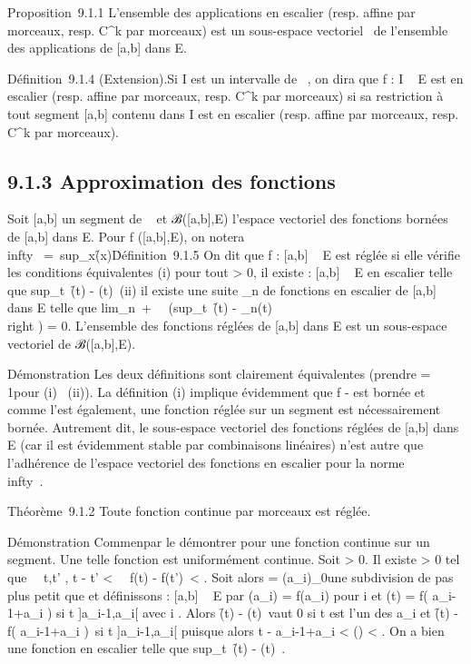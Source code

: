 \documentclass[]{article}
\begin{document}
Proposition~9.1.1 L'ensemble des applications en escalier (resp. affine
par morceaux, resp. C^k par morceaux) est un sous-espace
vectoriel ~de l'ensemble des applications de [a,b] dans E.

Définition~9.1.4 (Extension).Si I est un intervalle de ~, on dira que f
: I \rightarrow~ E est en escalier (resp. affine par morceaux, resp. C^k
par morceaux) si sa restriction à tout segment [a,b] contenu dans I
est en escalier (resp. affine par morceaux, resp. C^k par
morceaux).

\subsection{9.1.3 Approximation des fonctions}

Soit [a,b] un segment de ~ et ℬ([a,b],E) l'espace vectoriel des
fonctions bornées de [a,b] dans E. Pour f ([a,b],E), on notera
\f\\infty~
=\
sup_x\in[a,b]\f(x)\.

Définition~9.1.5 On dit que f : [a,b] \rightarrow~ E est réglée si elle vérifie
les conditions équivalentes (i) pour tout \epsilon > 0, il existe
\phi : [a,b] \rightarrow~ E en escalier telle que
sup_t\in[a,b]~\f(t)
- \phi(t)\ \leq \epsilon (ii) il existe une suite
\phi_n de fonctions en escalier de [a,b] dans E telle que
lim_n\rightarrow~+\infty~~\left
(sup_t\in[a,b]~\f(t)
- \phi_n(t)\\right ) = 0.
L'ensemble des fonctions réglées de [a,b] dans E est un sous-espace
vectoriel de ℬ([a,b],E).

Démonstration Les deux définitions sont clairement équivalentes (prendre
\epsilon = 1\diagupn pour (i) \rigtharrow~(ii)). La définition (i) implique évidemment que f - \phi
est bornée et comme \phi l'est également, une fonction réglée sur un
segment est nécessairement bornée. Autrement dit, le sous-espace
vectoriel des fonctions réglées de [a,b] dans E (car il est
évidemment stable par combinaisons linéaires) n'est autre que
l'adhérence de l'espace vectoriel des fonctions en escalier pour la
norme \.\\infty~.

Théorème~9.1.2 Toute fonction continue par morceaux est réglée.

Démonstration Commen\ccons par le démontrer pour une
fonction continue sur un segment. Une telle fonction est uniformément
continue. Soit \epsilon > 0. Il existe \eta > 0 tel que
\forall~~t,t' \in [a,b], t - t'
< \eta \rigtharrow~\ f(t) -
f(t')\ < \epsilon. Soit alors \sigma =
(a_i)_0\leqi\leqn une subdivision de pas plus petit que \eta et
définissons \phi : [a,b] \rightarrow~ E par \phi(a_i) = f(a_i) pour
i \in [0,n] et \phi(t) = f( a_i-1+a_i
 ) si t \in]a_i-1,a_i[ avec
i \in [1,n]. Alors \f(t) -
\phi(t)\ vaut 0 si t est l'un des a_i et
\f(t) - f( a_i-1+a_i
 )\ \leq \epsilon si t
\in]a_i-1,a_i[ puisque alors t -
a_i-1+a_i  
< \delta(\sigma) < \eta. On a bien une fonction \phi en escalier
telle que
sup_t\in[a,b]~\f(t)
- \phi(t)\ \leq \epsilon.
\end{document}
